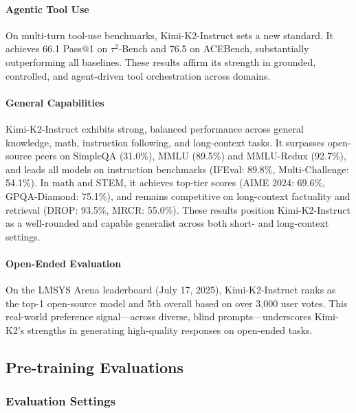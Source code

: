 \paragraph{Agentic Tool Use}
On multi-turn tool-use benchmarks, Kimi-K2-Instruct sets a new standard. It achieves 66.1 Pass@1 on $\tau^2$-Bench and 76.5 on ACEBench, substantially outperforming all baselines. These results affirm its strength in grounded, controlled, and agent-driven tool orchestration across domains.

\paragraph{General Capabilities}
Kimi-K2-Instruct exhibits strong, balanced performance across general knowledge, math, instruction following, and long-context tasks. It surpasses open-source peers on SimpleQA (31.0\%), MMLU (89.5\%) and MMLU-Redux (92.7\%), and leads all models on instruction benchmarks (IFEval: 89.8\%, Multi-Challenge: 54.1\%). In math and STEM, it achieves top-tier scores (AIME 2024: 69.6\%, GPQA-Diamond: 75.1\%), and remains competitive on long-context factuality and retrieval (DROP: 93.5\%, MRCR: 55.0\%). These results position Kimi-K2-Instruct as a well-rounded and capable generalist across both short- and long-context settings.

\paragraph{Open-Ended Evaluation}
On the LMSYS Arena leaderboard (July 17, 2025), Kimi-K2-Instruct ranks as the top-1 open-source model and 5th overall based on over 3,000 user votes. This real-world preference signal—across diverse, blind prompts—underscores Kimi-K2's strengths in generating high-quality responses on open-ended tasks.








\subsection{Pre-training Evaluations}



\subsubsection{Evaluation Settings}



